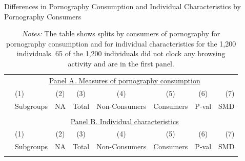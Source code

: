 \documentclass[12pt, letterpaper]{article}
\begin{document}
\begin{table}[ht] \centering \small \setlength\tabcolsep{5 pt}
	\caption{Differences in Pornography Consumption and Individual Characteristics by Pornography Consumers}
	\label{tab:characteristics_split_by_porn_consumers}
	\begin{adjustbox}{max width=\textwidth}
		\begin{tabular}{@{\hspace{0\tabcolsep}}llrcccrr@{\hspace{0\tabcolsep}}}
			\toprule
			&\multicolumn{7}{c}{\underline{Panel A. Measures of pornography consumption}}\\
			&\multicolumn{1}{l}{(1)}&\multicolumn{1}{c}{(2)}&\multicolumn{1}{c}{(3)}&\multicolumn{1}{c}{(4)}&\multicolumn{1}{c}{(5)}&\multicolumn{1}{c}{(6)}&\multicolumn{1}{r}{(7)}\\			
			&\multicolumn{1}{l}{Subgroups}&\multicolumn{1}{c}{NA}&\multicolumn{1}{c}{Total}&\multicolumn{1}{c}{Non-Consumers}&\multicolumn{1}{c}{Consumers}&\multicolumn{1}{c}{P-val}&\multicolumn{1}{r}{SMD}\\
			\cmidrule{2-8}
			\\
			\cmidrule{2-8}
			&\multicolumn{7}{c}{\underline{Panel B. Individual characteristics}}\\
			&\multicolumn{1}{l}{(1)}&\multicolumn{1}{c}{(2)}&\multicolumn{1}{c}{(3)}&\multicolumn{1}{c}{(4)}&\multicolumn{1}{c}{(5)}&\multicolumn{1}{c}{(6)}&\multicolumn{1}{r}{(7)}\\			
			&\multicolumn{1}{l}{Subgroups}&\multicolumn{1}{c}{NA}&\multicolumn{1}{c}{Total}&\multicolumn{1}{c}{Non-Consumers}&\multicolumn{1}{c}{Consumers}&\multicolumn{1}{c}{P-val}&\multicolumn{1}{r}{SMD}\\
			\cmidrule{2-8}
			\\
			\bottomrule
		\end{tabular}
	\end{adjustbox}
	\caption*{\scriptsize \emph{Notes:}
		The table shows splits by consumers of pornography for pornography consumption and for individual characteristics for the 1,200 individuals.
		65 of the 1,200 individuals did not clock any browsing activity and are in the first panel.
}
\end{table}
\end{document}
